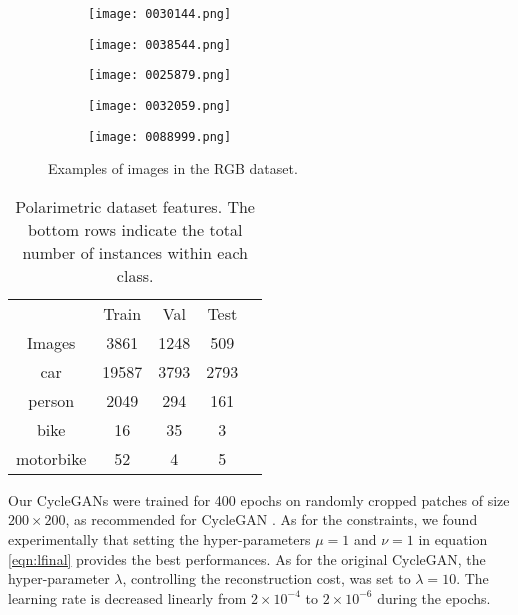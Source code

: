 \begin{figure}
	\centering
	\begin{subfigure}{.2\textwidth}
		\centering
		\texttt{[image: 0030144.png]}
	\end{subfigure}%
	\begin{subfigure}{.2\textwidth}
		\centering
		\texttt{[image: 0038544.png]}
	\end{subfigure}%
	\begin{subfigure}{.2\textwidth}
		\centering
		\texttt{[image: 0025879.png]}
	\end{subfigure}%
	\begin{subfigure}{.2\textwidth}
		\centering
		\texttt{[image: 0032059.png]}
	\end{subfigure}%
	\begin{subfigure}{.2\textwidth}
		\centering
		\texttt{[image: 0088999.png]}
	\end{subfigure}
	\caption{Examples of images in the RGB dataset.}
	\label{fig:rgb_example}
\end{figure}

\begin{table}
	\begin{center}
		\begin{tabular}{c c c c c}
			\Bigrule
			& Train & Val & Test \\
			\bigrule
			Images & 3861 & 1248 & 509 \\
			\bigrule
			car & 19587 & 3793 & 2793 \\
			person & 2049 & 294 & 161 \\
			bike & 16 & 35 & 3 \\
			motorbike & 52 & 4 & 5 \\
		\end{tabular}
		\caption[Polarimetric dataset features]{Polarimetric dataset features. The bottom rows indicate the total number of instances within each class.}
		\label{tab:dataset_properties}
	\end{center}
\end{table}

Our \ac{CycleGAN}s were trained for 400 epochs on randomly cropped patches of size $200\times 200$, as recommended for CycleGAN \citep{Zhu2017a}. As for the constraints, we found experimentally that setting the hyper-parameters $\mu = 1$ and $\nu = 1$ in equation \eqref{eqn:lfinal} provides the best performances. As for the original CycleGAN, the hyper-parameter $\lambda$, controlling the reconstruction cost, was set to $\lambda = 10$. The learning rate is decreased linearly from $2 \times 10^{-4}$ to $2 \times 10^{-6}$ during the epochs.

